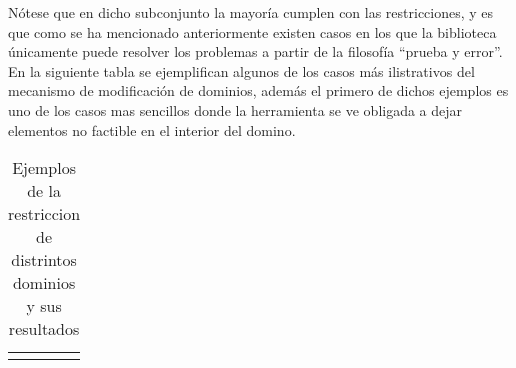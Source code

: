 Nótese que en dicho subconjunto la mayoría cumplen con las restricciones, y es que como se ha mencionado anteriormente existen
casos en los que la biblioteca únicamente puede resolver los problemas a partir de la filosofía “prueba y error”. En la siguiente
tabla se ejemplifican algunos de los casos más ilistrativos del mecanismo de modificación de dominios, además el primero de dichos
ejemplos es uno de los casos mas sencillos donde la herramienta se ve obligada a dejar elementos no factible en el interior del
domino.

\setlength\LTleft{-3cm}
\setlength\LTright{-5cm}
\begin{longtable}{ | p{6cm} | p{2cm}| p{3.5cm}| p{6.5cm}|  }
    \caption{Ejemplos de la restriccion de distrintos dominios y sus resultados }\label{chap2:examples} \\
    \endfirsthead
    \hline
    \endhead
    \hline
    \endfoot
    \hline
    \endlastfoot


\end{longtable}
